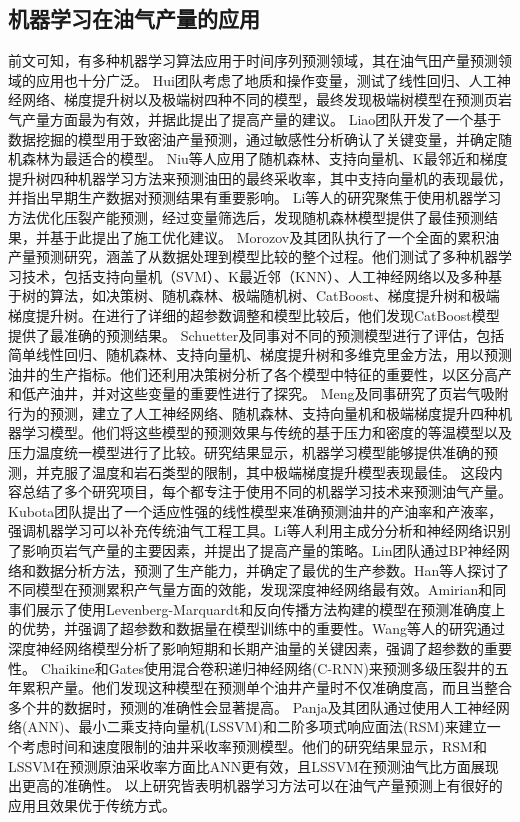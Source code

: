 \subsection{机器学习在油气产量的应用}
前文可知，有多种机器学习算法应用于时间序列预测领域，其在油气田产量预测领域的应用也十分广泛。
Hui团队考虑了地质和操作变量，测试了线性回归、人工神经网络、梯度提升树以及极端树四种不同的模型，最终发现极端树模型在预测页岩气产量方面最为有效，并据此提出了提高产量的建议。
Liao团队开发了一个基于数据挖掘的模型用于致密油产量预测，通过敏感性分析确认了关键变量，并确定随机森林为最适合的模型。
Niu等人应用了随机森林、支持向量机、K最邻近和梯度提升树四种机器学习方法来预测油田的最终采收率，其中支持向量机的表现最优，并指出早期生产数据对预测结果有重要影响。
Li等人的研究聚焦于使用机器学习方法优化压裂产能预测，经过变量筛选后，发现随机森林模型提供了最佳预测结果，并基于此提出了施工优化建议。
Morozov及其团队执行了一个全面的累积油产量预测研究，涵盖了从数据处理到模型比较的整个过程。他们测试了多种机器学习技术，包括支持向量机（SVM）、K最近邻（KNN）、人工神经网络以及多种基于树的算法，如决策树、随机森林、极端随机树、CatBoost、梯度提升树和极端梯度提升树。在进行了详细的超参数调整和模型比较后，他们发现CatBoost模型提供了最准确的预测结果。
Schuetter及同事对不同的预测模型进行了评估，包括简单线性回归、随机森林、支持向量机、梯度提升树和多维克里金方法，用以预测油井的生产指标。他们还利用决策树分析了各个模型中特征的重要性，以区分高产和低产油井，并对这些变量的重要性进行了探究。
Meng及同事研究了页岩气吸附行为的预测，建立了人工神经网络、随机森林、支持向量机和极端梯度提升四种机器学习模型。他们将这些模型的预测效果与传统的基于压力和密度的等温模型以及压力温度统一模型进行了比较。研究结果显示，机器学习模型能够提供准确的预测，并克服了温度和岩石类型的限制，其中极端梯度提升模型表现最佳。
这段内容总结了多个研究项目，每个都专注于使用不同的机器学习技术来预测油气产量。Kubota团队提出了一个适应性强的线性模型来准确预测油井的产油率和产液率，强调机器学习可以补充传统油气工程工具。Li等人利用主成分分析和神经网络识别了影响页岩气产量的主要因素，并提出了提高产量的策略。Lin团队通过BP神经网络和数据分析方法，预测了生产能力，并确定了最优的生产参数。Han等人探讨了不同模型在预测累积产气量方面的效能，发现深度神经网络最有效。Amirian和同事们展示了使用Levenberg-Marquardt和反向传播方法构建的模型在预测准确度上的优势，并强调了超参数和数据量在模型训练中的重要性。Wang等人的研究通过深度神经网络模型分析了影响短期和长期产油量的关键因素，强调了超参数的重要性。
Chaikine和Gates使用混合卷积递归神经网络(C-RNN)来预测多级压裂井的五年累积产量。他们发现这种模型在预测单个油井产量时不仅准确度高，而且当整合多个井的数据时，预测的准确性会显著提高。
Panja及其团队通过使用人工神经网络(ANN)、最小二乘支持向量机(LSSVM)和二阶多项式响应面法(RSM)来建立一个考虑时间和速度限制的油井采收率预测模型。他们的研究结果显示，RSM和LSSVM在预测原油采收率方面比ANN更有效，且LSSVM在预测油气比方面展现出更高的准确性。
以上研究皆表明机器学习方法可以在油气产量预测上有很好的应用且效果优于传统方式。

